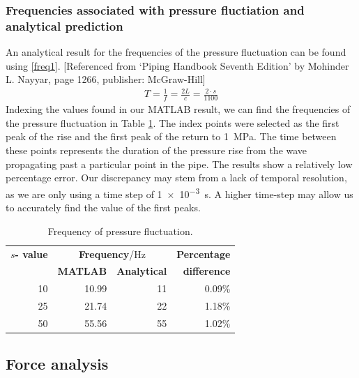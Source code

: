 \subsubsection{Frequencies associated with pressure fluctiation and analytical prediction}
An analytical result for the frequencies of the pressure fluctuation can be found using \eqref{freq1}. [Referenced from `Piping Handbook Seventh Edition' by Mohinder L. Nayyar, page 1266, publisher: McGraw-Hill]
\begin{gather}\label{freq1}
    T = \frac{1}{f} = \frac{2L}{c} = \frac{2\cdot s}{1100}
\end{gather}
Indexing the values found in our MATLAB result, we can find the frequencies of the pressure fluctuation in Table \ref{freq2}. The index points were selected as the first peak of the rise and the first peak of the return to \SI{1}{\mega\pascal}. The time between these points represents the duration of the pressure rise from the wave propagating past a particular point in the pipe. The results show a relatively low percentage error. Our discrepancy may stem from a lack of temporal resolution, as we are only using a time step of \SI{1e-3}{\second}. A higher time-step may allow us to accurately find the value of the first peaks.
\begin{table}[H]
    \centering
    \begin{tabular}{@{}rrrr@{}}
        \toprule
        \textbf{$s$- value} & \multicolumn{2}{c}{\textbf{Frequency}/\si{\hertz}} & \textbf{Percentage}                       \\
                            & \textbf{MATLAB}                                    & \textbf{Analytical} & \textbf{difference} \\
        \midrule
        10                  & 10.99                                              & 11                  & 0.09\%              \\
        25                  & 21.74                                              & 22                  & 1.18\%              \\
        50                  & 55.56                                              & 55                  & 1.02\%              \\
        \bottomrule
    \end{tabular}
    \caption{Frequency of pressure fluctuation.}
    \label{freq2}
\end{table}
\subsection{Force analysis}
